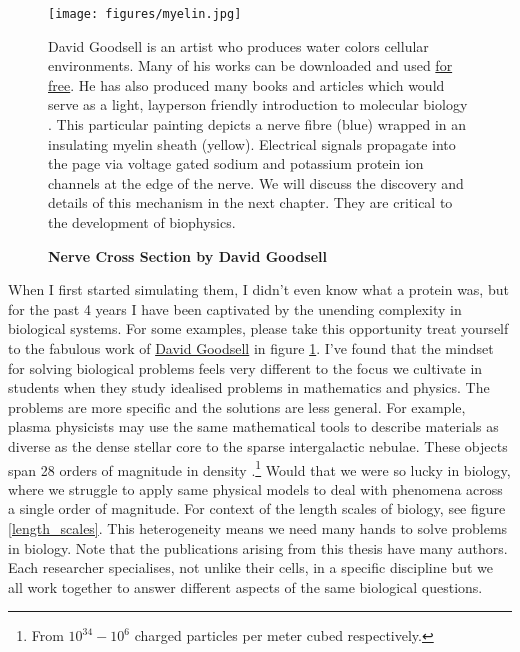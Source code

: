\begin{figure}[h]
	\begin{center}
		\texttt{[image: figures/myelin.jpg]}
	\end{center}
	\captionsetup{singlelinecheck = false, justification=raggedright}
	\caption[Nerve Cross Section by David Goodsell] {\textbf{Nerve Cross Section by David Goodsell}}{David Goodsell is an artist who produces water colors cellular environments. Many of his works can be downloaded and used \href{https://pdb101.rcsb.org/sci-art/goodsell-gallery}{for free}. He has also produced many books and articles which would serve as a light, layperson friendly introduction to molecular biology \cite{goodsell2009, goodsell2018, goodsell2020}. This particular painting depicts a nerve fibre (blue) wrapped in an insulating myelin sheath (yellow). Electrical signals propagate into the page via voltage gated sodium and potassium protein ion channels at the edge of the nerve\cite{goodsell_nerve}. We will discuss the discovery and details of this mechanism in the next chapter. They are critical to the development of biophysics.}
	\label{goodsell_figure}
\end{figure}

When I first started simulating them, I didn't even know what a protein was, but for the past 4 years I have been captivated by the unending complexity in biological systems. For some examples, please take this opportunity treat yourself to the fabulous work of \href {https://pdb101.rcsb.org/sci-art/goodsell-gallery}{David Goodsell} in figure \ref{goodsell_figure}. I've found that the mindset for solving biological problems feels very different to the focus we cultivate in students when they study idealised problems in mathematics and physics. The problems are more specific and the solutions are less general. For example, plasma physicists may use the same mathematical tools to describe materials as diverse as the dense stellar core to the sparse intergalactic nebulae. These objects span 28 orders of magnitude in density \cite{chen2018}.\footnote{From $10^{34}-10^6$ charged particles per meter cubed respectively. } Would that we were so lucky in biology, where we struggle to apply same physical models to deal with phenomena across a single order of magnitude. For context of the length scales of biology, see figure \ref{length_scales}. This heterogeneity means we need many hands to solve problems in biology. Note that the publications arising from this thesis have many authors. Each researcher specialises, not unlike their cells, in a specific discipline but we all work together to answer different aspects of the same biological questions.

